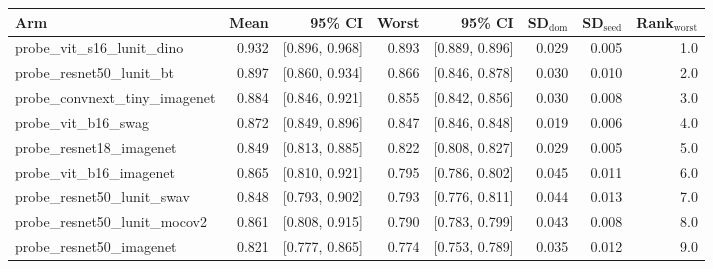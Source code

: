 \begin{tabular}{lrrrrrrr}
\toprule
Arm & Mean & 95\% CI & Worst & 95\% CI & SD$_\text{dom}$ & SD$_\text{seed}$ & Rank$_\text{worst}$ \\
\midrule
probe\_vit\_s16\_lunit\_dino & 0.932 & [0.896, 0.968] & 0.893 & [0.889, 0.896] & 0.029 & 0.005 & 1.0 \\
probe\_resnet50\_lunit\_bt & 0.897 & [0.860, 0.934] & 0.866 & [0.846, 0.878] & 0.030 & 0.010 & 2.0 \\
probe\_convnext\_tiny\_imagenet & 0.884 & [0.846, 0.921] & 0.855 & [0.842, 0.856] & 0.030 & 0.008 & 3.0 \\
probe\_vit\_b16\_swag & 0.872 & [0.849, 0.896] & 0.847 & [0.846, 0.848] & 0.019 & 0.006 & 4.0 \\
probe\_resnet18\_imagenet & 0.849 & [0.813, 0.885] & 0.822 & [0.808, 0.827] & 0.029 & 0.005 & 5.0 \\
probe\_vit\_b16\_imagenet & 0.865 & [0.810, 0.921] & 0.795 & [0.786, 0.802] & 0.045 & 0.011 & 6.0 \\
probe\_resnet50\_lunit\_swav & 0.848 & [0.793, 0.902] & 0.793 & [0.776, 0.811] & 0.044 & 0.013 & 7.0 \\
probe\_resnet50\_lunit\_mocov2 & 0.861 & [0.808, 0.915] & 0.790 & [0.783, 0.799] & 0.043 & 0.008 & 8.0 \\
probe\_resnet50\_imagenet & 0.821 & [0.777, 0.865] & 0.774 & [0.753, 0.789] & 0.035 & 0.012 & 9.0 \\
\bottomrule
\end{tabular}
